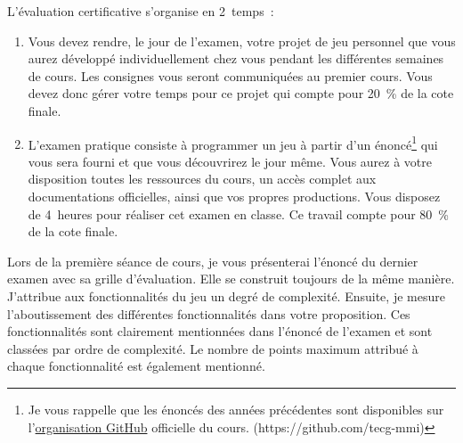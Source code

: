 L’évaluation certificative s'organise en 2~temps~:
\begin{enumerate}
    \item Vous devez rendre, le jour de l'examen, votre projet de jeu personnel que vous aurez développé individuellement chez vous pendant les différentes semaines de cours. Les consignes vous seront communiquées au premier cours. Vous devez donc gérer votre temps pour ce projet qui compte pour 20~\% de la cote finale.
    \item L'examen pratique consiste à programmer un jeu à partir d'un énoncé\footnote{Je vous rappelle que les énoncés des années précédentes sont disponibles sur l'\href{https://github.com/tecg-mmi}{organisation GitHub} officielle du cours. (https://github.com/tecg-mmi)} qui vous sera fourni et que vous découvrirez le jour même. Vous aurez à votre disposition toutes les ressources du cours, un accès complet aux documentations officielles, ainsi que vos propres productions. Vous disposez de 4~heures pour réaliser cet examen en classe. Ce travail compte pour 80~\% de la cote finale.
\end{enumerate}
Lors de la première séance de cours, je vous présenterai l'énoncé du dernier examen avec sa grille d'évaluation. Elle se construit toujours de la même manière. J'attribue aux fonctionnalités du jeu un degré de complexité. Ensuite, je mesure l'aboutissement des différentes fonctionnalités dans votre proposition. Ces fonctionnalités sont clairement mentionnées dans l'énoncé de l'examen et sont classées par ordre de complexité. Le nombre de points maximum attribué à chaque fonctionnalité est également mentionné.


